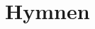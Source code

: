 \documentclass[a5paper, 11pt]{book}
\begin{document}
\tableofcontents


\chapter{Hymnen}


\pagebreak
\printindex
\end{document}
